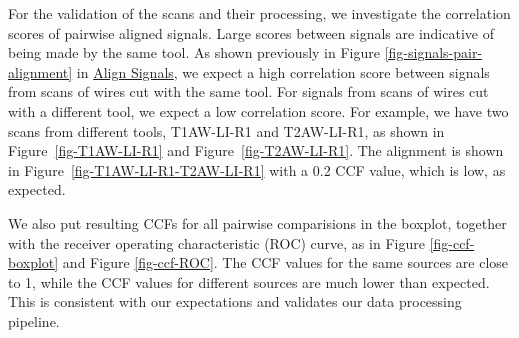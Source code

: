 \documentclass[fleqn,10pt]{wlscirep}
\begin{document}
For the validation of the scans and their processing, we investigate the
correlation scores of pairwise aligned signals. Large scores between
signals are indicative of being made by the same tool. As shown
previously in Figure \ref{fig-signals-pair-alignment} in
\hyperref[sec-align-signals]{Align Signals}, we expect a high
correlation score between signals from scans of wires cut with the same
tool. For signals from scans of wires cut with a different tool, we
expect a low correlation score. For example, we have two scans from
different tools, T1AW-LI-R1 and T2AW-LI-R1, as shown in
Figure~\ref{fig-T1AW-LI-R1} and Figure~\ref{fig-T2AW-LI-R1}. The
alignment is shown in Figure~\ref{fig-T1AW-LI-R1-T2AW-LI-R1} with a 0.2
CCF value, which is low, as expected.

We also put resulting CCFs for all pairwise comparisions in the boxplot,
together with the receiver operating characteristic (ROC) curve, as in
Figure \ref{fig-ccf-boxplot} and Figure \ref{fig-ccf-ROC}. The CCF
values for the same sources are close to 1, while the CCF values for
different sources are much lower than expected. This is consistent with
our expectations and validates our data processing pipeline.
\end{document}
